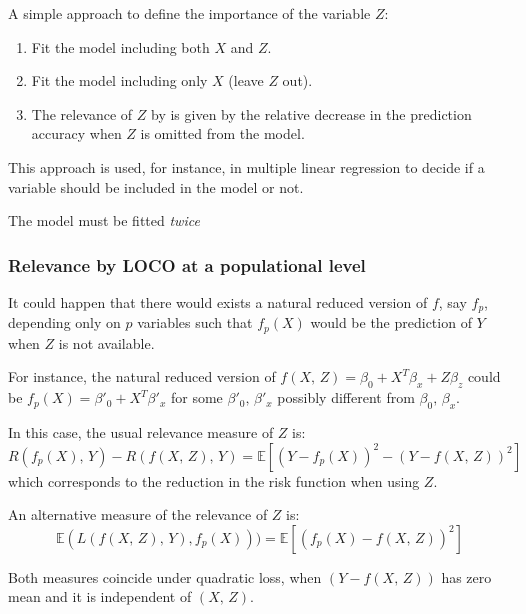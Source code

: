 A simple approach to define the importance of the variable $Z$:
\begin{enumerate}
    \item Fit the model including both $X$ and $Z$.
    \item Fit the model including only $X$ (leave $Z$ out).
    \item The relevance of $Z$ by  is given by the relative
        decrease in the prediction accuracy when $Z$ is omitted from the model.
\end{enumerate}

This approach is used, for instance, in multiple linear regression
to decide if a variable should be included in the model or not.

\begin{note}
    The model must be fitted \emph{twice}
\end{note}

\subsubsection{Relevance by LOCO at a populational level}

It could happen that there would exists a natural reduced version of
$f$, say $f_p$, depending only on $p$ variables such that $f_p(X)$ would be the prediction
of $Y$ when $Z$ is not available.

For instance, the natural reduced version of $f(X,\,Z) = \beta_0 + X^T\beta_x + Z\beta_z$
could be $f_p(X) = \beta'_0 + X^T\beta'_x$ for some $\beta'_0,\,\beta'_x$ possibly
different from $\beta_0,\,\beta_x$.

In this case, the usual relevance measure of $Z$ is:
\begin{equation*}
    R(f_p(X),\,Y) - R(f(X,\,Z),\,Y) = \mathds{E} \left[ (Y - f_p(X))^2 - (Y - f(X,\,Z))^2 \right]
\end{equation*}
which corresponds to the reduction in the risk function when using $Z$.

An alternative measure of the relevance of $Z$ is:
\begin{equation*}
    \mathds{E}(L(f(X,\,Z),\,Y),f_p(X))) = \mathds{E} \left[ (f_p(X) - f(X,\,Z))^2 \right]
\end{equation*}

Both measures coincide under quadratic loss, when $(Y - f(X,\,Z))$ has zero mean
and it is independent of $(X,\,Z)$.

